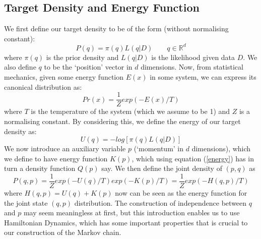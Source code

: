 \documentclass[11pt]{article}
\begin{document}
\subsection{Target Density and Energy Function}
We first define our target density to be of the form (without normalising constant):
\begin{equation}
P(q)= \pi(q)L(q|D) \quad \quad q \in \mathbb{R}^{d}
\end{equation}
where $\pi(q)$ is the prior density and $L(q|D)$ is the likelihood given data $D$. 
We also define $q$ to be the `position' vector in $d$ dimensions. Now, from statistical mechanics, given some energy function $E(x)$ in some system, we can express its canonical distribution as:
\begin{equation}
\label{energy}
Pr(x) = \frac{1}{Z}exp(-E(x)/T)
\end{equation}
where $T$ is the temperature of the system (which we assume to be 1) and $Z$ is a normalising constant. By considering this, we define the energy of our target density as:
\begin{equation}
U(q) = -log[\pi(q)L(q|D)]
\end{equation}
We now introduce an auxiliary variable $p$ (`momentum' in $d$ dimensions), which we define to have energy function $K(p)$, which using equation (\ref{energy}) has in turn a density function $Q(p)$ say. We then define the joint density of $(p,q)$ as 
\begin{equation}
P(q,p) = \frac{1}{Z}exp(-U(q)/T)exp(-K(p)/T) = \frac{1}{Z}exp(-H(q,p)/T)
\end{equation}
where $H(q,p) = U(q) + K(p)$ now can be seen as the energy function for the joint state $(q,p)$ distribution. The construction of independence between $q$ and $p$ may seem meaningless at first, but this introduction enables us to use Hamiltonian Dynamics, which has some important properties that is crucial to our construction of the Markov chain.
\end{document}
